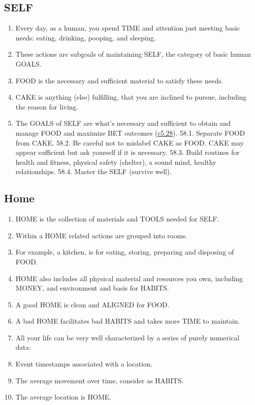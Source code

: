 \documentclass[
]{book}
\providecommand{\tightlist}{%
  \setlength{\itemsep}{0pt}\setlength{\parskip}{0pt}}
\begin{document}
\hypertarget{self-1}{%
\subsection{SELF}\label{self-1}}

\begin{enumerate}
\def\labelenumi{\arabic{enumi}.}
\setcounter{enumi}{53}
\tightlist
\item
  Every day, as a human, you spend TIME and attention just meeting basic needs:
  eating, drinking, pooping, and sleeping.
\item
  These actions are subgoals of maintaining SELF, the category of basic human GOALS.
\item
  FOOD is the necessary and sufficient material to satisfy these needs.
\item
  CAKE is anything (else) fulfilling, that you are inclined to pursue, including the reason for living.
\item
  The GOALS of SELF are what's necessary and sufficient to obtain and manage FOOD and maximize BET outcomes (\protect\hyperlink{bet}{c5.28}).
  58.1. Separate FOOD from CAKE.
  58.2. Be careful not to mislabel CAKE as FOOD. CAKE may appear sufficient but
  ask yourself if it is necessary.
  58.3. Build routines for health and fitness, physical safety (shelter), a sound
  mind, healthy relationships.
  58.4. Master the SELF (survive well).
\end{enumerate}

\hypertarget{home}{%
\subsection{Home}\label{home}}

\begin{enumerate}
\def\labelenumi{\arabic{enumi}.}
\setcounter{enumi}{58}
\item
  HOME is the collection of materials and TOOLS needed for SELF.
\item
  Within a HOME related actions are grouped into rooms.
\item
  For example, a kitchen, is for eating, storing, preparing and disposing of FOOD.
\item
  HOME also includes all physical material and resources you own, including
  MONEY, and environment and basis for HABITS.
\item
  A good HOME is clean and ALIGNED for FOOD.
\item
  A bad HOME facilitates bad HABITS and takes more TIME to maintain.
\item
  All your life can be very well characterized by a series of purely numerical data:
\item
  Event timestamps associated with a location.
\item
  The average movement over time, consider as HABITS.
\item
  The average location is HOME.
\end{enumerate}
\end{document}
